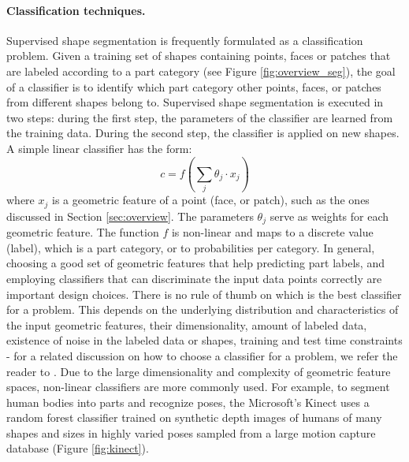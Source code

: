 \paragraph*{Classification techniques.} Supervised shape segmentation is frequently formulated as a classification problem. Given a training set of shapes containing points, faces or patches that are labeled according to a part category (see Figure \ref{fig:overview_seg}), the goal of a classifier is to identify which part category other points, faces, or patches from different shapes belong to. Supervised shape segmentation is executed in two steps: during the first step, the parameters of the classifier are learned from the training data. During the second step, the classifier is applied on new shapes. A simple linear classifier has the form:
\begin{equation}
c = f ( \sum\limits_j \theta_j \cdot x_j )
\end{equation}
where $x_j$ is a geometric feature of a point (face, or patch), such as the ones discussed in Section \ref{sec:overview}. The parameters $\theta_j$ serve as weights for each geometric feature. The function $f$ is non-linear and maps to a discrete value (label), which is a part category, or to probabilities per category. In general, choosing a good set of geometric features that help predicting part labels, and employing classifiers that can discriminate the input data points correctly are important design choices. There is no rule of thumb on which is the best classifier for a problem. This depends on the underlying distribution and characteristics of the input geometric features, their dimensionality, amount of labeled data, existence of noise in the labeled data or shapes, training and test time constraints - for a related discussion on how to choose a classifier for a problem, we refer the reader to \cite{Manning:2008:IIR}. Due to the large dimensionality and complexity of geometric feature spaces, non-linear classifiers are more commonly used. For example, to segment human bodies into parts and recognize poses, the Microsoft's Kinect uses a random forest classifier trained on synthetic depth images of humans of many shapes and sizes in highly varied poses sampled from a large motion capture database \cite{Shotton:2011:RLH} (Figure \ref{fig:kinect}).


